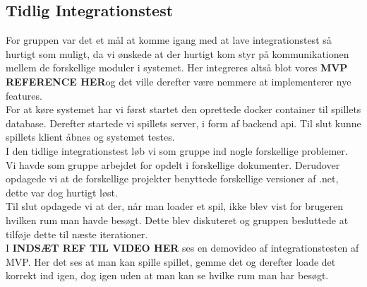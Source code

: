 \subsection{Tidlig Integrationstest}
For gruppen var det et mål at komme igang med at lave integrationstest så hurtigt som muligt, da vi ønskede at der hurtigt kom styr på kommunikationen mellem de forskellige moduler i systemet. Her integreres altså blot vores \textbf{MVP REFERENCE HER}og det ville derefter være nemmere at implementerer nye features.\\

\noindent For at køre systemet har vi først startet den oprettede docker container til spillets database. Derefter startede vi spillets server, i form af backend api. Til slut kunne spillets klient åbnes og systemet testes.\\

\noindent I den tidlige integrationstest løb vi som gruppe ind nogle forskellige problemer.\\
Vi havde som gruppe arbejdet for opdelt i forskellige dokumenter. 
Derudover opdagede vi at de forskellige projekter benyttede forskellige versioner af .net, dette var dog hurtigt løst.\\
Til slut opdagede vi at der, når man loader et spil, ikke blev vist for brugeren hvilken rum man havde besøgt. Dette blev diskuteret og gruppen besluttede at tilføje dette til næste iterationer.\\

\noindent I \textbf{INDSÆT REF TIL VIDEO HER} ses en demovideo af integrationstesten af MVP. Her det ses at man kan spille spillet, gemme det og derefter loade det korrekt ind igen, dog igen uden at man kan se hvilke rum man har besøgt.
